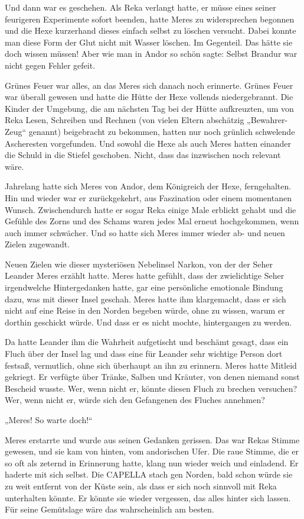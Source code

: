 Und dann war es geschehen. Als Reka verlangt hatte, er müsse eines seiner feurigeren Experimente sofort beenden, hatte Meres zu widersprechen begonnen und die Hexe kurzerhand dieses einfach selbst zu löschen versucht. Dabei konnte man diese Form der Glut nicht mit Wasser löschen. Im Gegenteil. Das hätte sie doch wissen müssen! Aber wie man in Andor so schön sagte: Selbst Brandur war nicht gegen Fehler gefeit.

Grünes Feuer war alles, an das Meres sich danach noch erinnerte. Grünes Feuer war überall gewesen und hatte die Hütte der Hexe vollends niedergebrannt. Die Kinder der Umgebung, die am nächsten Tag bei der Hütte aufkreuzten, um von Reka Lesen, Schreiben und Rechnen (von vielen Eltern abschätzig „Bewahrer-Zeug“ genannt) beigebracht zu bekommen, hatten nur noch grünlich schwelende Ascheresten vorgefunden. Und sowohl die Hexe als auch Meres hatten einander die Schuld in die Stiefel geschoben. Nicht, dass das inzwischen noch relevant wäre.

Jahrelang hatte sich Meres von Andor, dem Königreich der Hexe, ferngehalten. Hin und wieder war er zurückgekehrt, aus Faszination oder einem momentanen Wunsch. Zwischendurch hatte er sogar Reka einige Male erblickt gehabt und die Gefühle des Zorns und des Schams waren jedes Mal erneut hochgekommen, wenn auch immer schwächer. Und so hatte sich Meres immer wieder ab- und neuen Zielen zugewandt.

Neuen Zielen wie dieser mysteriösen Nebelinsel Narkon, von der der Seher Leander Meres erzählt hatte. Meres hatte gefühlt, dass der zwielichtige Seher irgendwelche Hintergedanken hatte, gar eine persönliche emotionale Bindung dazu, was mit dieser Insel geschah. Meres hatte ihm klargemacht, dass er sich nicht auf eine Reise in den Norden begeben würde, ohne zu wissen, warum er dorthin geschickt würde. Und dass er es nicht mochte, hintergangen zu werden.

Da hatte Leander ihm die Wahrheit aufgetischt und beschämt gesagt, dass ein Fluch über der Insel lag und dass eine für Leander sehr wichtige Person dort festsaß, vermutlich, ohne sich überhaupt an ihn zu erinnern. Meres hatte Mitleid gekriegt. Er verfügte über Tränke, Salben und Kräuter, von denen niemand sonst Bescheid wusste. Wer, wenn nicht er, könnte diesen Fluch zu brechen versuchen? Wer, wenn nicht er, würde sich den Gefangenen des Fluches annehmen?

„Meres! So warte doch!“

Meres erstarrte und wurde aus seinen Gedanken gerissen. Das war Rekas Stimme gewesen, und sie kam von hinten, vom andorischen Ufer. Die raue Stimme, die er so oft als zeternd in Erinnerung hatte, klang nun wieder weich und einladend. Er haderte mit sich selbst. Die CAPELLA stach gen Norden, bald schon würde sie zu weit entfernt von der Küste sein, als dass er sich noch sinnvoll mit Reka unterhalten könnte. Er könnte sie wieder vergessen, das alles hinter sich lassen. Für seine Gemütslage wäre das wahrscheinlich am besten.

